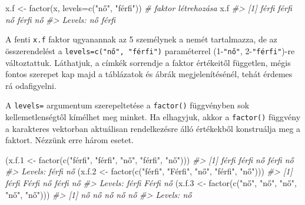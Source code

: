\documentclass[
]{book}
\newenvironment{Shaded}{\begin{snugshade}}{\end{snugshade}}
\newcommand{\AttributeTok}[1]{\textcolor[rgb]{0.77,0.63,0.00}{#1}}
\newcommand{\CommentTok}[1]{\textcolor[rgb]{0.56,0.35,0.01}{\textit{#1}}}
\newcommand{\FloatTok}[1]{\textcolor[rgb]{0.00,0.00,0.81}{#1}}
\newcommand{\FunctionTok}[1]{\textcolor[rgb]{0.00,0.00,0.00}{#1}}
\newcommand{\NormalTok}[1]{#1}
\newcommand{\OtherTok}[1]{\textcolor[rgb]{0.56,0.35,0.01}{#1}}
\newcommand{\StringTok}[1]{\textcolor[rgb]{0.31,0.60,0.02}{#1}}
\begin{document}
\begin{Shaded}
\begin{Highlighting}[]
\NormalTok{x.f }\OtherTok{\textless{}{-}} \FunctionTok{factor}\NormalTok{(x, }\AttributeTok{levels=}\FunctionTok{c}\NormalTok{(}\StringTok{"nő"}\NormalTok{, }\StringTok{"férfi"}\NormalTok{))      }\CommentTok{\# faktor létrehozása}
\NormalTok{x.f}
\CommentTok{\#\textgreater{} [1] férfi férfi nő    férfi nő   }
\CommentTok{\#\textgreater{} Levels: nő férfi}
\end{Highlighting}
\end{Shaded}

A fenti \texttt{x.f} faktor ugyanannak az 5 személynek a nemét tartalmazza, de az összerendelést a \texttt{levels=c("nő",\ "férfi")} paraméterrel (1-\texttt{"nő"}, 2-\texttt{"férfi"})-re változtattuk. Láthatjuk, a címkék sorrendje a faktor értékeitől független, mégis fontos szerepet kap majd a táblázatok és ábrák megjelenítésénél, tehát érdemes rá odafigyelni.

A \texttt{levels=} argumentum szerepeltetése a \texttt{factor()} függvényben sok kellemetlenségtől kímélhet meg minket. Ha elhagyjuk, akkor a \texttt{factor()} függvény a karakteres vektorban aktuálisan rendelkezésre álló értékekből konstruálja meg a faktort. Nézzünk erre három esetet.

\begin{Shaded}
\begin{Highlighting}[]
\NormalTok{(x.f}\FloatTok{.1} \OtherTok{\textless{}{-}} \FunctionTok{factor}\NormalTok{(}\FunctionTok{c}\NormalTok{(}\StringTok{"férfi"}\NormalTok{, }\StringTok{"férfi"}\NormalTok{, }\StringTok{"nő"}\NormalTok{, }\StringTok{"férfi"}\NormalTok{, }\StringTok{"nő"}\NormalTok{)))}
\CommentTok{\#\textgreater{} [1] férfi férfi nő    férfi nő   }
\CommentTok{\#\textgreater{} Levels: férfi nő}
\NormalTok{(x.f}\FloatTok{.2} \OtherTok{\textless{}{-}} \FunctionTok{factor}\NormalTok{(}\FunctionTok{c}\NormalTok{(}\StringTok{"férfi"}\NormalTok{, }\StringTok{"Férfi"}\NormalTok{, }\StringTok{"nő"}\NormalTok{, }\StringTok{"férfi"}\NormalTok{, }\StringTok{"nő"}\NormalTok{)))}
\CommentTok{\#\textgreater{} [1] férfi Férfi nő    férfi nő   }
\CommentTok{\#\textgreater{} Levels: férfi Férfi nő}
\NormalTok{(x.f}\FloatTok{.3} \OtherTok{\textless{}{-}} \FunctionTok{factor}\NormalTok{(}\FunctionTok{c}\NormalTok{(}\StringTok{"nő"}\NormalTok{, }\StringTok{"nő"}\NormalTok{, }\StringTok{"nő"}\NormalTok{, }\StringTok{"nő"}\NormalTok{, }\StringTok{"nő"}\NormalTok{)))}
\CommentTok{\#\textgreater{} [1] nő nő nő nő nő}
\CommentTok{\#\textgreater{} Levels: nő}
\end{Highlighting}
\end{Shaded}
\end{document}
